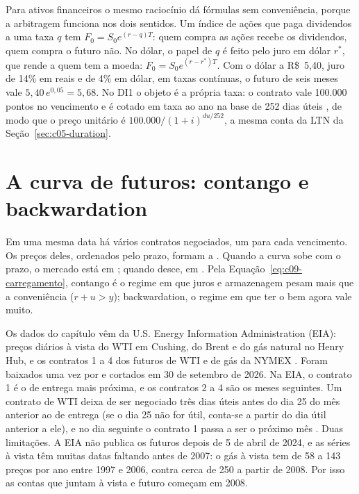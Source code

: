 Para ativos financeiros o mesmo raciocínio dá fórmulas sem conveniência, porque a arbitragem funciona nos dois sentidos. Um índice de ações que paga dividendos a uma taxa $q$ tem $F_0 = S_0 e^{(r-q)T}$: quem compra as ações recebe os dividendos, quem compra o futuro não. No dólar, o papel de $q$ é feito pelo juro em dólar $r^{*}$, que rende a quem tem a moeda: $F_0 = S_0 e^{(r-r^{*})T}$. Com o dólar a R\$~5,40, juro de 14\% em reais e de 4\% em dólar, em taxas contínuas, o futuro de seis meses vale $5,40\,e^{0,05} = 5,68$. No DI1 o objeto é a própria taxa: o contrato vale 100.000 pontos no vencimento e é cotado em taxa ao ano na base de 252 dias úteis \citep{b3di1}, de modo que o preço unitário é $100.000/(1+i)^{du/252}$, a mesma conta da LTN da Seção~\ref{sec:c05-duration}.

\section{A curva de futuros: contango e backwardation}
\label{sec:c09-curva}

Em uma mesma data há vários contratos negociados, um para cada vencimento. Os preços deles, ordenados pelo prazo, formam a . Quando a curva sobe com o prazo, o mercado está em \textbf{}; quando desce, em \textbf{}. Pela Equação~\eqref{eq:c09-carregamento}, contango é o regime em que juros e armazenagem pesam mais que a conveniência ($r+u > y$); backwardation, o regime em que ter o bem agora vale muito.

Os dados do capítulo vêm da U.S. Energy Information Administration (EIA): preços diários à vista do WTI em Cushing, do Brent e do gás natural no Henry Hub, e os contratos 1 a 4 dos futuros de WTI e de gás da NYMEX \citep{eia2026dados}. Foram baixados uma vez por  e cortados em 30 de setembro de 2026. Na EIA, o contrato 1 é o de entrega mais próxima, e os contratos 2 a 4 são os meses seguintes. Um contrato de WTI deixa de ser negociado três dias úteis antes do dia 25 do mês anterior ao de entrega (se o dia 25 não for útil, conta-se a partir do dia útil anterior a ele), e no dia seguinte o contrato 1 passa a ser o próximo mês \citep{eia2026dados, cmecl}. Duas limitações. A EIA não publica os futuros depois de 5 de abril de 2024, e as séries à vista têm muitas datas faltando antes de 2007: o gás à vista tem de 58 a 143 preços por ano entre 1997 e 2006, contra cerca de 250 a partir de 2008. Por isso as contas que juntam à vista e futuro começam em 2008.

